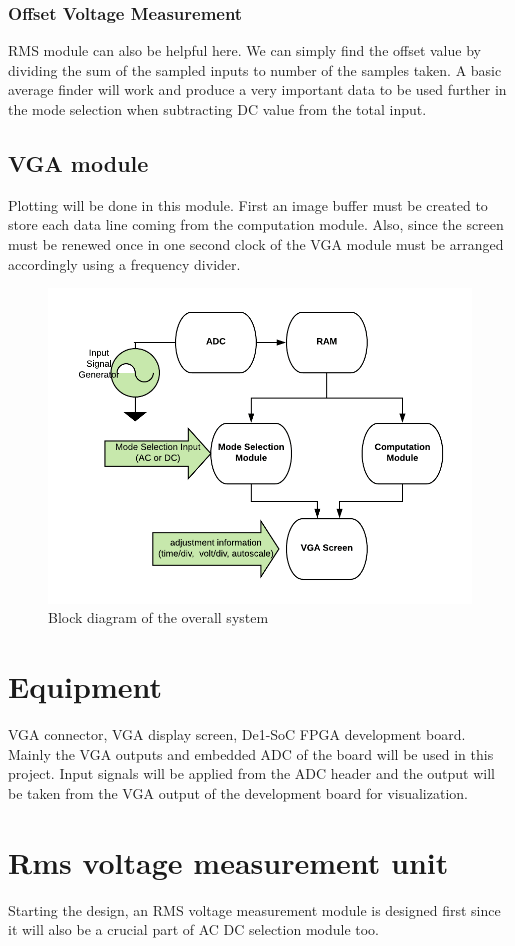 \documentclass[10pt]{article}
\begin{document}
\subsubsection*{Offset Voltage Measurement}
RMS module can also be helpful here. We can simply find the offset value by dividing the sum of the sampled inputs to number of the samples taken. A basic average finder will work and produce a very important data to be used further in the mode selection when subtracting DC value from the total input.
\subsection*{VGA module}
Plotting will be done in this module. First an image buffer must be created to store each data line coming from the computation module. Also, since the screen must be renewed once in one second clock of the VGA module must be arranged accordingly using a frequency divider.
\begin{figure}[H]
  \includegraphics[scale=0.4, center]{blockdiagram}
  \caption{Block diagram of the overall system}
  \label{fig:zero}
\end{figure}
\section*{Equipment}
VGA connector, VGA display screen, De1-SoC FPGA development board.
Mainly the VGA outputs and embedded ADC of the board will be used in this project. Input signals will be applied from the ADC header and the output will be taken from the VGA output of the development board for visualization.
\section*{Rms voltage measurement unit}
Starting the design, an RMS voltage measurement module is designed first since it will also be a crucial part of AC DC selection module too.
\end{document}
